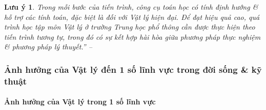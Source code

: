 \documentclass{article}
\numberwithin{equation}{section}
\newtheorem{luuy}{Lưu ý}[section]
\begin{document}
\begin{luuy}
	Trong mỗi bước của tiến trình, công cụ toán học có tính định hướng \& hỗ trợ các tính toán, đặc biệt là đối với Vật lý hiện đại. Để đạt hiệu quả cao, quá trình học tập môn Vật lý ở trường Trung học phổ thông cần được thực hiện theo tiến trình tương tự, trong đó có sự kết hợp hài hòa giữa phương pháp thực nghiệm \& phương pháp lý thuyết.'' -- \cite[p. 9]{SGK_Vat_Ly_10_Chan_Troi_Sang_Tao}
\end{luuy}

\subsubsection{Ảnh hưởng của Vật lý đến 1 số lĩnh vực trong đời sống \& kỹ thuật}

\paragraph{Ảnh hưởng của Vật lý trong 1 số lĩnh vực}
\end{document}
